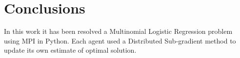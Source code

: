 \documentclass[a4paper,11pt,oneside]{book}
\begin{document}

\chapter*{Conclusions} %
In this work it has been resolved a Multinomial Logistic Regression problem using MPI in Python. Each agent used a Distributed Sub-gradient method to update its own estimate of optimal solution.


{}
	
\end{document}
